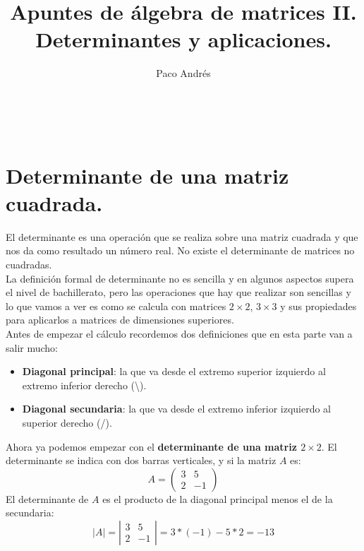 \documentclass[a4paper,11pt,answers]{exam}
\def \autor{Paco Andrés}
\def \titulo{Apuntes de álgebra de matrices II. Determinantes y aplicaciones.}
\begin{document}
\title{\titulo}
\date{}
\author{\autor}
\maketitle

\begin{center}
\doclicenseLongText\\
\vspace{.25cm}
\doclicenseImage
\end{center}
\section{Determinante de una matriz cuadrada.}
El determinante es una operación que se realiza sobre una matriz cuadrada y que nos da como resultado un número real. No existe el determinante de
matrices no cuadradas.\\

La definición formal de determinante no es sencilla y en algunos aspectos supera el nivel de bachillerato, pero las operaciones que hay que realizar son
sencillas y lo que vamos a ver es como se calcula con matrices $2\times 2$, $3 \times 3$ y sus propiedades para aplicarlos a matrices de dimensiones superiores.\\

Antes de empezar el cálculo recordemos dos definiciones que en esta parte van a salir mucho:
\begin{itemize}
	\item \textbf{Diagonal principal}: la que va desde el extremo superior izquierdo al extremo inferior derecho (\textbackslash).
	\item \textbf{Diagonal secundaria}: la que va desde el extremo inferior izquierdo al superior derecho (/).
\end{itemize}


Ahora ya podemos empezar con el \textbf{determinante de una matriz $2 \times 2$}. El determinante se indica con dos barras verticales, y si la matriz $A$ es:
\[A= \left(\begin{array}{rr}
	3&5\\
	2&-1
\end{array}\right)\]
El determinante de $A$ es el producto de la diagonal principal menos el de la secundaria:
\[|A| = \left| \begin{array}{rr}
	3&5\\
	2&-1
\end{array}\right| = 3*(-1) - 5*2 = -13\]
\end{document}

